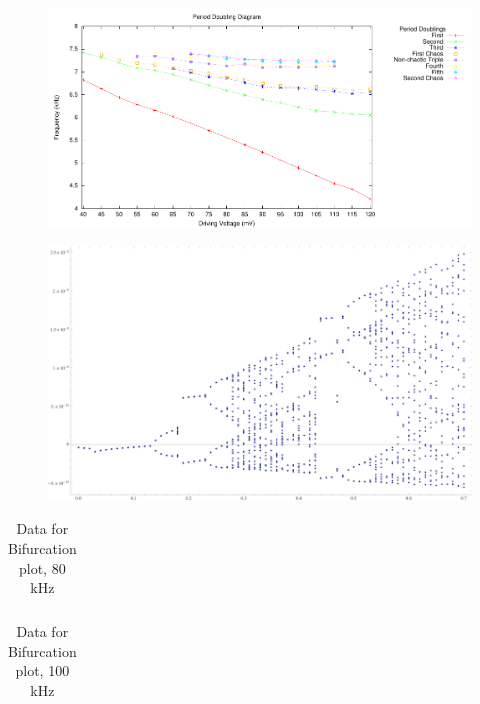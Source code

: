 \documentclass[12pt]{report}
\begin{document}
	\begin{figure}[h]
		\centering
		
	\end {figure}

	\begin{figure}[h]
		\centering
		\includegraphics{plots/general.pdf}
	\end{figure}

	\begin{figure}[h]
		\centering
		\includegraphics{simulations/circuit.png}
	\end{figure}

	\begin{table}
		\centering
		\begin{tabular}{|l|l|l||l|l|l|}
			\hline
			 
		\end{tabular}
		\label{tab:80khz}
		\caption{Data for Bifurcation plot, 80 kHz}
	\end{table}

	\begin{table}
		\centering
		\begin{tabular}{|l|l|l|l||l|l|l|l|}
			\hline
			 
		\end{tabular}
		\label{tab:100khz}
		\caption{Data for Bifurcation plot, 100 kHz}
	\end{table}
\end{document}
